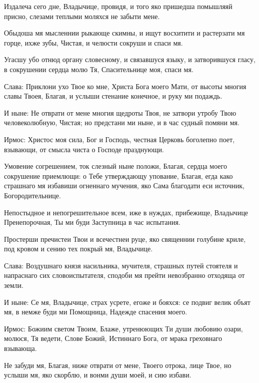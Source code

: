 \begin{mymulticols}
Издалеча сего дне, Владычице, провидя, и того яко пришедша помышляяй присно, слезами теплыми моляхся не забыти мене.


Обыдоша мя мысленнии рыкающе скимны, и ищут восхитити и растерзати мя горце, ихже зубы, Чистая, и челюсти сокруши и спаси мя.


Угасшу убо отнюд органу словесному, и связавшуся языку, и затворившуся гласу, в сокрушении сердца молю Тя, Спасительнице моя, спаси мя.


Слава: Приклони ухо Твое ко мне, Христа Бога моего Мати, от высоты многия славы Твоея, Благая, и услыши стенание конечное, и руку ми подаждь.


И ныне: Не отврати от мене многия щедроты Твоя, не затвори утробу Твою человеколюбную, Чистая; но предстани ми ныне, и в час судный помяни мя.




Ирмос: Христос моя сила, Бог и Господь, честная Церковь боголепно поет, взывающи, от смысла чиста о Господе празднующи.





Умовение согрешением, ток слезный ныне положи, Благая, сердца моего сокрушение приемлющи: о Тебе утверждающу упование, Благая, егда како страшнаго мя избавиши огненнаго мучения, яко Сама благодати еси источник, Богородительнице.


Непостыдное и непогрешительное всем, иже в нуждах, прибежище, Владычице Пренепорочная, Ты ми буди Заступница в час испытания.


Простерши пречистеи Твои и всечестнеи руце, яко священнии голубине криле, под кровом и сению тех покрый мя, Владычице.


Слава: Воздушнаго князя насильника, мучителя, страшных путей стоятеля и напраснаго сих словоиспытателя, сподоби мя прейти невозбранно отходяща от земли.


И ныне: Се мя, Владычице, страх усрете, егоже и бояхся: се подвиг велик объят мя, в немже буди ми Помощница, Надежде спасения моего.




Ирмос: Божиим светом Твоим, Блаже, утренюющих Ти души любовию озари, молюся, Тя ведети, Слове Божий, Истиннаго Бога, от мрака греховнаго взывающа.





Не забуди мя, Благая, ниже отврати от мене, Твоего отрока, лице Твое, но услыши мя, яко скорблю, и вонми души моей, и сию избави.



\end{mymulticols}
